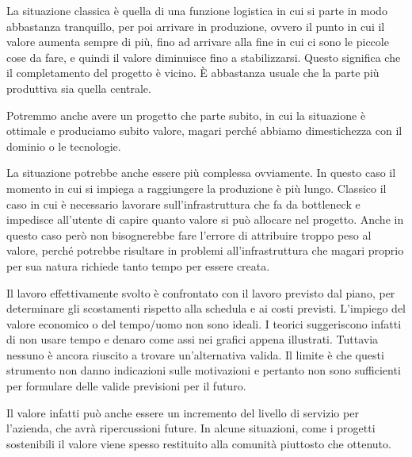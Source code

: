 \noindent La situazione classica è quella di una funzione logistica in cui si parte in modo abbastanza tranquillo, per poi arrivare in produzione, ovvero il punto in cui il valore aumenta sempre di più, fino ad arrivare alla fine in cui ci sono le piccole cose da fare, e quindi il valore diminuisce fino a stabilizzarsi. Questo significa che il completamento del progetto è vicino. È abbastanza usuale che la parte più produttiva sia quella centrale.


\noindent Potremmo anche avere un progetto che parte subito, in cui la situazione è ottimale e produciamo subito valore, magari perché abbiamo dimestichezza con il dominio o le tecnologie.


\noindent La situazione potrebbe anche essere più complessa ovviamente. In questo caso il momento in cui si impiega a raggiungere la produzione è più lungo. Classico il caso in cui è necessario lavorare sull'infrastruttura che fa da bottleneck e impedisce all'utente di capire quanto valore si può allocare nel progetto. Anche in questo caso però non bisognerebbe fare l'errore di attribuire troppo peso al valore, perché potrebbe risultare in problemi all'infrastruttura che magari proprio per sua natura richiede tanto tempo per essere creata.


\noindent Il lavoro effettivamente svolto è confrontato con il lavoro previsto dal piano, per determinare gli scostamenti rispetto alla schedula e ai costi
previsti.\newline
L’impiego del valore economico o del tempo/uomo non sono ideali. I teorici suggeriscono infatti di non usare tempo e denaro come assi nei grafici appena illustrati. Tuttavia nessuno è ancora riuscito a trovare un'alternativa valida.\newline
Il limite è che questi strumento non danno indicazioni sulle motivazioni e pertanto non sono sufficienti per formulare delle valide previsioni per il
futuro.

\noindent Il valore infatti può anche essere un incremento del livello di servizio per l'azienda, che avrà ripercussioni future. In alcune situazioni, come i progetti sostenibili il valore viene spesso restituito alla comunità piuttosto che ottenuto.

